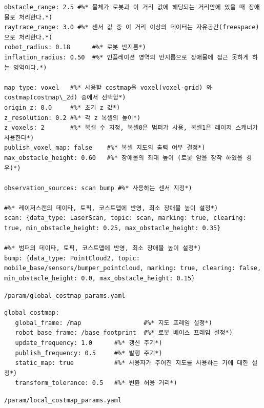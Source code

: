 \vspace{\baselineskip}
\begin{lstlisting}[language=ROS]
obstacle_range: 2.5 #%* 물체가 로봇과 이 거리 값에 해당되는 거리안에 있을 때 장애물로 처리한다.*)
raytrace_range: 3.0 #%* 센서 값 중 이 거리 이상의 데이터는 자유공간(freespace)으로 처리한다.*)
robot_radius: 0.18      #%* 로봇 반지름*)
inflation_radius: 0.50  #%* 인플레이션 영역의 반지름으로 장애물에 접근 못하게 하는 영역이다.*)

map_type: voxel   #%* 사용할 costmap을 voxel(voxel-grid) 와 costmap(costmap\_2d) 중에서 선택함*)
origin_z: 0.0     #%* 초기 z 값*)
z_resolution: 0.2 #%* 각 z 복셀의 높이*)
z_voxels: 2       #%* 복셀 수 지정, 복셀0은 범퍼가 사용, 복셀1은 레이저 스캐너가 사용한다*)
publish_voxel_map: false    #%* 복셀 지도의 출력 여부 결정*)
max_obstacle_height: 0.60   #%* 장애물의 최대 높이 (로봇 암을 장착 하였을 경우)*)

observation_sources: scan bump #%* 사용하는 센서 지정*)

#%* 레이저스캔의 데이타, 토픽, 코스트맵에 반영, 최소 장애물 높이 설정*)
scan: {data_type: LaserScan, topic: scan, marking: true, clearing: true, min_obstacle_height: 0.25, max_obstacle_height: 0.35}

#%* 범퍼의 데이타, 토픽, 코스트맵에 반영, 최소 장애물 높이 설정*)
bump: {data_type: PointCloud2, topic: mobile_base/sensors/bumper_pointcloud, marking: true, clearing: false, min_obstacle_height: 0.0, max_obstacle_height: 0.15}
\end{lstlisting}

\vspace{\baselineskip}
\begin{lstlisting}[language=ROS]
/param/global_costmap_params.yaml
\end{lstlisting}

\vspace{\baselineskip}
\begin{lstlisting}[language=ROS]
global_costmap:
   global_frame: /map                 #%* 지도 프레임 설정*)
   robot_base_frame: /base_footprint  #%* 로봇 베이스 프레임 설정*)
   update_frequency: 1.0      #%* 갱신 주기*)
   publish_frequency: 0.5     #%* 발행 주기*)
   static_map: true           #%* 사용자가 주어진 지도를 사용하는 가에 대한 설정*)
   transform_tolerance: 0.5   #%* 변환 허용 거리*)
\end{lstlisting}

\vspace{\baselineskip}
\begin{lstlisting}[language=ROS]
/param/local_costmap_params.yaml
\end{lstlisting}

